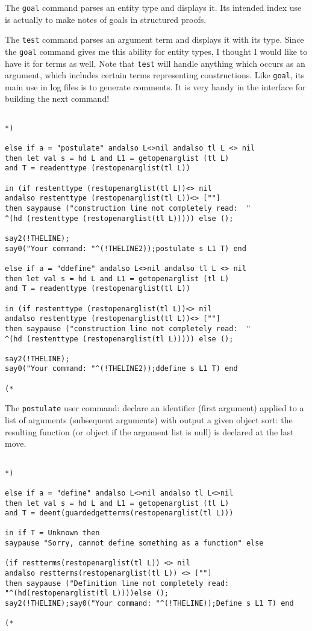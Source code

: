 \documentclass{article}
\begin{document}
The {\tt goal} command parses an entity type and displays it.  Its intended index use is actually to make notes of goals in structured proofs.

The {\tt test} command parses an argument term and displays it with its type.  Since the {\tt goal} command gives me this ability for entity
types, I thought I would like to have it for terms as well.  Note that {\tt test} will handle anything which occurs as an argument, which includes certain terms
representing constructions.  Like {\tt goal}, its main use in log files is to generate comments.  It is very handy in the interface for building the next command!

\begin{verbatim}

*)

else if a = "postulate" andalso L<>nil andalso tl L <> nil 
then let val s = hd L and L1 = getopenarglist (tl L) 
and T = readenttype (restopenarglist(tl L))

in (if restenttype (restopenarglist(tl L))<> nil 
andalso restenttype (restopenarglist(tl L))<> [""] 
then saypause ("construction line not completely read:  "
^(hd (restenttype (restopenarglist(tl L))))) else ();

say2(!THELINE);
say0("Your command: "^(!THELINE2));postulate s L1 T) end

else if a = "ddefine" andalso L<>nil andalso tl L <> nil 
then let val s = hd L and L1 = getopenarglist (tl L) 
and T = readenttype (restopenarglist(tl L))

in (if restenttype (restopenarglist(tl L))<> nil 
andalso restenttype (restopenarglist(tl L))<> [""] 
then saypause ("construction line not completely read:  "
^(hd (restenttype (restopenarglist(tl L))))) else ();

say2(!THELINE);
say0("Your command: "^(!THELINE2));ddefine s L1 T) end

(*

\end{verbatim}

The {\tt postulate} user command:  declare an identifier (first argument) applied to a list of arguments
(subsequent arguments) with output a given object sort:  the resulting function (or object if the argument list is null) 
is declared at the last move.

\begin{verbatim}

*)

else if a = "define" andalso L<>nil andalso tl L<>nil 
then let val s = hd L and L1 = getopenarglist (tl L) 
and T = deent(guardedgetterms(restopenarglist(tl L)))

in if T = Unknown then 
saypause "Sorry, cannot define something as a function" else

(if restterms(restopenarglist(tl L)) <> nil 
andalso restterms(restopenarglist(tl L)) <> [""] 
then saypause ("Definition line not completely read:  "^(hd(restopenarglist(tl L))))else ();
say2(!THELINE);say0("Your command: "^(!THELINE));Define s L1 T) end

(*

\end{verbatim}
\end{document}
